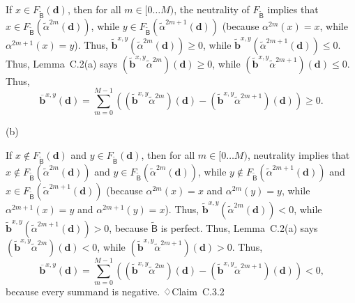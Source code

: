 \documentclass[
]{article}
\begin{document}
If \(x \in F_{\widetilde{\mathsf{B}}}\left( \mathbf{d} \right)\), then
for all \(m \in \lbrack 0\ldots M)\), the neutrality of
\(F_{\widetilde{\mathsf{B}}}\) implies that
\(x \in F_{\widetilde{\mathsf{B}}}\left( {\widetilde{\alpha}}^{2m}\left( \mathbf{d} \right) \right)\),
while
\(y \in F_{\widetilde{\mathsf{B}}}\left( {\widetilde{\alpha}}^{2m + 1}\left( \mathbf{d} \right) \right)\)
(because \(\alpha^{2m}(x) = x\), while \(\alpha^{2m + 1}(x) = y\)).
Thus,
\({\widetilde{\mathbf{b}}}^{x,y}\left( {\widetilde{\alpha}}^{2m}\left( \mathbf{d} \right) \right) \geq 0\),
while
\({\widetilde{\mathbf{b}}}^{x,y}\left( {\widetilde{\alpha}}^{2m + 1}\left( \mathbf{d} \right) \right) \leq 0\).
Thus, Lemma~C.2(a) says
\(\left( {\widetilde{\mathbf{b}}}^{x,y}{\widetilde{\alpha}}^{2m} \right)\left( \mathbf{d} \right) \geq 0\),
while
\(\left( {\widetilde{\mathbf{b}}}^{x,y}{\widetilde{\alpha}}^{2m + 1} \right)\left( \mathbf{d} \right) \leq 0\).
Thus,\[{\overline{\mathbf{b}}}^{x,y}\left( \mathbf{d} \right)\underset{}{=}\sum\limits_{m = 0}^{M - 1}\left( \left( {\widetilde{\mathbf{b}}}^{x,y}{\widetilde{\alpha}}^{2m} \right)\left( \mathbf{d} \right) - \left( {\widetilde{\mathbf{b}}}^{x,y}{\widetilde{\alpha}}^{2m + 1} \right)\left( \mathbf{d} \right) \right) \geq 0\text{.}\]

(b)

If \(x \notin F_{\widetilde{\mathsf{B}}}\left( \mathbf{d} \right)\) and
\(y \in F_{\widetilde{\mathsf{B}}}\left( \mathbf{d} \right)\), then for
all \(m \in \lbrack 0\ldots M)\), neutrality implies that
\(x \notin F_{\widetilde{\mathsf{B}}}\left( {\widetilde{\alpha}}^{2m}\left( \mathbf{d} \right) \right)\)
and
\(y \in F_{\widetilde{\mathsf{B}}}\left( {\widetilde{\alpha}}^{2m}\left( \mathbf{d} \right) \right)\),
while
\(y \notin F_{\widetilde{\mathsf{B}}}\left( {\widetilde{\alpha}}^{2m + 1}\left( \mathbf{d} \right) \right)\)
and
\(x \in F_{\widetilde{\mathsf{B}}}\left( {\widetilde{\alpha}}^{2m + 1}\left( \mathbf{d} \right) \right)\)
(because \(\alpha^{2m}(x) = x\) and \(\alpha^{2m}(y) = y\), while
\(\alpha^{2m + 1}(x) = y\) and \(\alpha^{2m + 1}(y) = x\)). Thus,
\({\widetilde{\mathbf{b}}}^{x,y}\left( {\widetilde{\alpha}}^{2m}\left( \mathbf{d} \right) \right) < 0\),
while
\({\widetilde{\mathbf{b}}}^{x,y}\left( {\widetilde{\alpha}}^{2m + 1}\left( \mathbf{d} \right) \right) > 0\),
because \(\widetilde{\mathsf{B}}\) is perfect. Thus, Lemma~C.2(a) says
\(\left( {\widetilde{\mathbf{b}}}^{x,y}{\widetilde{\alpha}}^{2m} \right)\left( \mathbf{d} \right) < 0\),
while
\(\left( {\widetilde{\mathbf{b}}}^{x,y}{\widetilde{\alpha}}^{2m + 1} \right)\left( \mathbf{d} \right) > 0\).
Thus,
\[{\overline{\mathbf{b}}}^{x,y}\left( \mathbf{d} \right)\underset{}{=}\sum\limits_{m = 0}^{M - 1}\left( \left( {\widetilde{\mathbf{b}}}^{x,y}{\widetilde{\alpha}}^{2m} \right)\left( \mathbf{d} \right) - \left( {\widetilde{\mathbf{b}}}^{x,y}{\widetilde{\alpha}}^{2m + 1} \right)\left( \mathbf{d} \right) \right) < 0\text{,}\]
because every summand is negative. ♢Claim~C.3.2
\end{document}
